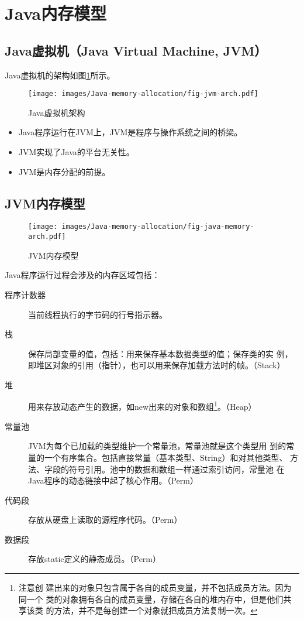 \section{Java内存模型}

\subsection{Java虚拟机（Java Virtual Machine, JVM）}

Java虚拟机的架构如图\ref{fig:jvm-arch}所示。

\begin{figure}[htb]
  \centering
  \texttt{[image: images/Java-memory-allocation/fig-jvm-arch.pdf]}
  \caption{Java虚拟机架构}
  \label{fig:jvm-arch}
\end{figure}

\begin{itemize}
\item Java程序运行在JVM上，JVM是程序与操作系统之间的桥梁。
\item JVM实现了Java的平台无关性。
\item JVM是内存分配的前提。
\end{itemize}

\subsection{JVM内存模型}

\begin{figure}[htb]
  \centering
  \texttt{[image: images/Java-memory-allocation/fig-java-memory-arch.pdf]}
  \caption{JVM内存模型}
  \label{fig:java-memory-arch}
\end{figure}

Java程序运行过程会涉及的内存区域包括：

\begin{description}
\item[程序计数器] 当前线程执行的字节码的行号指示器。
\item[栈] 保存局部变量的值，包括：用来保存基本数据类型的值；保存类的实
  例，即堆区对象的引用（指针），也可以用来保存加载方法时的帧。（Stack）
\item[堆] 用来存放动态产生的数据，如new出来的对象和数组\footnote{注意创
    建出来的对象只包含属于各自的成员变量，并不包括成员方法。因为同一个
    类的对象拥有各自的成员变量，存储在各自的堆内存中，但是他们共享该类
    的方法，并不是每创建一个对象就把成员方法复制一次。}。（Heap）
\item[常量池] JVM为每个已加载的类型维护一个常量池，常量池就是这个类型用
  到的常量的一个有序集合。包括直接常量（基本类型、String）和对其他类型、
  方法、字段的符号引用。池中的数据和数组一样通过索引访问，常量池
  在Java程序的动态链接中起了核心作用。（Perm）
\item[代码段] 存放从硬盘上读取的源程序代码。（Perm）
\item[数据段] 存放static定义的静态成员。{\Red （Perm）} 
\end{description}

